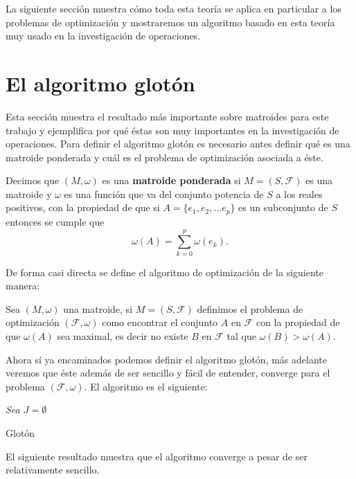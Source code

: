 La siguiente sección muestra cómo toda esta teoría se aplica en particular a los problemas de optimización y mostraremos un algoritmo basado en esta teoría muy usado en la investigación de operaciones. 

\section{El algoritmo glotón}

Esta sección muestra el resultado más importante sobre matroides para este trabajo y ejemplifica por qué éstas son muy importantes en la investigación de operaciones. Para definir el algoritmo glotón es necesario antes definir qué es una matroide ponderada y cuál es el problema de optimización asociada a éste. 

\begin{dfn}
Decimos que $(M,\omega)$ es una \textbf{matroide ponderada} si $M=(S,\mathcal{F})$ es una matroide y $\omega$ es una función que va del conjunto potencia de $S$ a los reales positivos, con la propiedad de que si $A=\{e_1,e_2,\dots e_p\}$ es un subconjunto de $S$ entonces se cumple que $$\omega(A) = \sum_{k=0}^p \omega(e_k).$$
\end{dfn}

De forma casi directa se define el algoritmo de optimización de la siguiente manera:

\begin{dfn}
Sea $(M,\omega)$ una matroide, si $M=(S,\mathcal{F})$ definimos el problema de optimización $(\mathcal{F},\omega)$ como encontrar el conjunto $A$ en $\mathcal{F}$ con la propiedad de que $\omega(A)$ sea maximal, es decir no existe $B$ en $\mathcal{F}$ tal que $\omega(B) > \omega(A)$.
\end{dfn}

Ahora sí ya encaminados podemos definir el algoritmo glotón, más adelante veremos que éste además de ser sencillo y fácil de entender, converge para el problema $(\mathcal{F},\omega)$. El algoritmo es el siguiente:

\IncMargin{1em}
\begin{Algoritmo}[H]
\BlankLine
\emph{Sea $J=\emptyset$ \; }
\caption{Glotón}
\end{Algoritmo}
\DecMargin{1em}
El siguiente resultado muestra que el algoritmo converge a pesar de ser relativamente sencillo.


